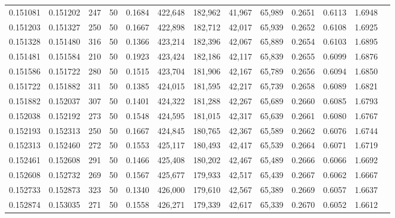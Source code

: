 \begin{tabular}{rrrrrrrrrrrrr}
0.151081 & 0.151202 &   247 &  50 &                                     0.1684 & 422,648 & 182,962 &  41,967 &  65,989 & 0.2651 & 0.6113 & 1.6948 \\
0.151203 & 0.151327 &   250 &  50 &                                     0.1667 & 422,898 & 182,712 &  42,017 &  65,939 & 0.2652 & 0.6108 & 1.6925 \\
0.151328 & 0.151480 &   316 &  50 &                                     0.1366 & 423,214 & 182,396 &  42,067 &  65,889 & 0.2654 & 0.6103 & 1.6895 \\
0.151481 & 0.151584 &   210 &  50 &                                     0.1923 & 423,424 & 182,186 &  42,117 &  65,839 & 0.2655 & 0.6099 & 1.6876 \\
0.151586 & 0.151722 &   280 &  50 &                                     0.1515 & 423,704 & 181,906 &  42,167 &  65,789 & 0.2656 & 0.6094 & 1.6850 \\
0.151722 & 0.151882 &   311 &  50 &                                     0.1385 & 424,015 & 181,595 &  42,217 &  65,739 & 0.2658 & 0.6089 & 1.6821 \\
0.151882 & 0.152037 &   307 &  50 &                                     0.1401 & 424,322 & 181,288 &  42,267 &  65,689 & 0.2660 & 0.6085 & 1.6793 \\
0.152038 & 0.152192 &   273 &  50 &                                     0.1548 & 424,595 & 181,015 &  42,317 &  65,639 & 0.2661 & 0.6080 & 1.6767 \\
0.152193 & 0.152313 &   250 &  50 &                                     0.1667 & 424,845 & 180,765 &  42,367 &  65,589 & 0.2662 & 0.6076 & 1.6744 \\
0.152313 & 0.152460 &   272 &  50 &                                     0.1553 & 425,117 & 180,493 &  42,417 &  65,539 & 0.2664 & 0.6071 & 1.6719 \\
0.152461 & 0.152608 &   291 &  50 &                                     0.1466 & 425,408 & 180,202 &  42,467 &  65,489 & 0.2666 & 0.6066 & 1.6692 \\
0.152608 & 0.152732 &   269 &  50 &                                     0.1567 & 425,677 & 179,933 &  42,517 &  65,439 & 0.2667 & 0.6062 & 1.6667 \\
0.152733 & 0.152873 &   323 &  50 &                                     0.1340 & 426,000 & 179,610 &  42,567 &  65,389 & 0.2669 & 0.6057 & 1.6637 \\
0.152874 & 0.153035 &   271 &  50 &                                     0.1558 & 426,271 & 179,339 &  42,617 &  65,339 & 0.2670 & 0.6052 & 1.6612 \\

\end{tabular}
